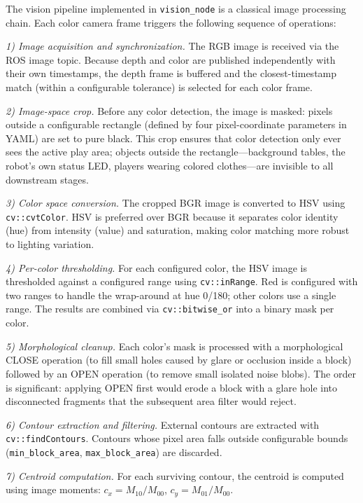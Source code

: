 \documentclass[conference]{IEEEtran}
\begin{document}
The vision pipeline implemented in \texttt{vision\_node} is a classical
image processing chain. Each color camera frame triggers the following
sequence of operations:

\textit{1) Image acquisition and synchronization.} The RGB image is
received via the ROS image topic. Because depth and color are published
independently with their own timestamps, the depth frame is buffered
and the closest-timestamp match (within a configurable tolerance) is
selected for each color frame.

\textit{2) Image-space crop.} Before any color detection, the image
is masked: pixels outside a configurable rectangle (defined by four
pixel-coordinate parameters in YAML) are set to pure black. This crop
ensures that color detection only ever sees the active play area;
objects outside the rectangle---background tables, the robot's own
status LED, players wearing colored clothes---are invisible to all
downstream stages.

\textit{3) Color space conversion.} The cropped BGR image is converted
to HSV using \texttt{cv::cvtColor}. HSV is preferred over BGR because
it separates color identity (hue) from intensity (value) and
saturation, making color matching more robust to lighting variation.

\textit{4) Per-color thresholding.} For each configured color, the
HSV image is thresholded against a configured range using
\texttt{cv::inRange}. Red is configured with two ranges to handle
the wrap-around at hue 0/180; other colors use a single range. The
results are combined via \texttt{cv::bitwise\_or} into a binary mask
per color.

\textit{5) Morphological cleanup.} Each color's mask is processed
with a morphological CLOSE operation (to fill small holes caused by
glare or occlusion inside a block) followed by an OPEN operation
(to remove small isolated noise blobs). The order is significant:
applying OPEN first would erode a block with a glare hole into
disconnected fragments that the subsequent area filter would reject.

\textit{6) Contour extraction and filtering.} External contours
are extracted with \texttt{cv::findContours}. Contours whose
pixel area falls outside configurable bounds (\texttt{min\_block\_area},
\texttt{max\_block\_area}) are discarded.

\textit{7) Centroid computation.} For each surviving contour, the
centroid is computed using image moments: $c_x = M_{10}/M_{00}$,
$c_y = M_{01}/M_{00}$.
\end{document}
